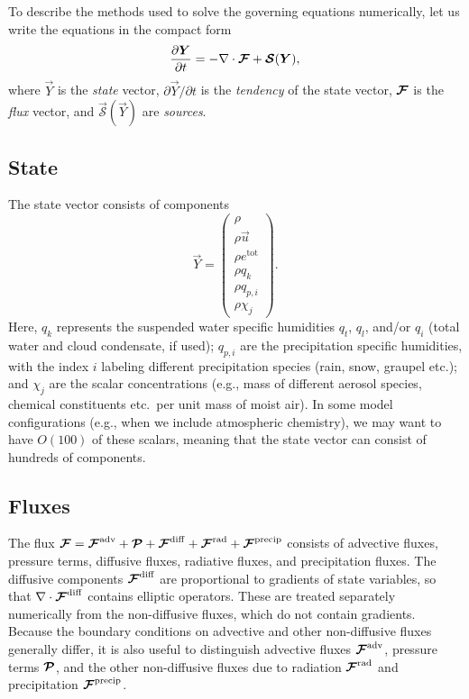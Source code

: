 \documentclass{report}
\begin{document}
{To describe the methods used to solve the governing equations numerically, let us write the equations in the compact form 
\begin{equation}\label{e:eom_compact}
\frac{\partial \boldsymbol{{Y}}}{\partial t}  =  - \nabla \cdot \boldsymbol{{\mathcal{F}}} + \boldsymbol{{\mathcal{S}}}(\boldsymbol{{Y}}),
\end{equation}
where $\vec{Y}$ is the \emph{state} vector, $\partial\vec{Y}/\partial t$ is the \emph{tendency} of the state vector, $\boldsymbol{{\mathcal{F}}}$ is the \emph{flux} vector, and $\vec{\mathcal{S}}(\vec{Y})$ are \emph{sources}. 

\subsection{State}

The state vector consists of components
\begin{equation}\label{e:state}
\vec{Y}=\left( \begin{array}{c}
\rho \\
\rho\vec{u} \\
\rho e^{\mathrm{tot}}\\
\rho q_k\\
\rho q_{p,i}\\
\rho \chi_j
\end{array}
\right).
\end{equation}
Here, $q_k$ represents the suspended water specific humidities $q_t$, $q_l$, and/or $q_i$ (total water and cloud condensate, if used); $q_{p,i}$ are the precipitation specific humidities, with the index $i$ labeling different precipitation species (rain, snow, graupel etc.); and $\chi_j$ are the scalar concentrations (e.g., mass of different aerosol species, chemical constituents etc.\ per unit mass of moist air). In some model configurations (e.g., when we include atmospheric chemistry), we may want to have $O(100)$ of these scalars, meaning that the state vector can consist of hundreds of components.

\subsection{Fluxes}\label{sec:fluxes}

The flux $\boldsymbol{{\mathcal{F}}}=\boldsymbol{{\mathcal{F}}}^{\mathrm{adv}} + \boldsymbol{{\mathcal{P}}} +  \boldsymbol{{\mathcal{F}}}^{\mathrm{diff}} + \boldsymbol{{\mathcal{F}}}^{\mathrm{rad}} + \boldsymbol{{\mathcal{F}}}^{\mathrm{precip}}$ consists of advective fluxes, pressure terms, diffusive fluxes, radiative fluxes, and precipitation fluxes. The diffusive components $\boldsymbol{{\mathcal{F}}}^{\mathrm{diff}}$ are proportional to gradients of state variables, so that $\nabla \cdot \boldsymbol{{\mathcal{F}}}^{\mathrm{diff}}$ contains elliptic operators. These are treated separately numerically from the non-diffusive fluxes, which do not contain gradients. Because the boundary conditions on advective and other non-diffusive fluxes generally differ, it is also useful to distinguish advective fluxes $\boldsymbol{{\mathcal{F}}}^{\mathrm{adv}}$, pressure terms $\boldsymbol{{\mathcal{P}}}$, and the other non-diffusive fluxes due to radiation $\boldsymbol{{\mathcal{F}}}^{\mathrm{rad}}$ and precipitation $\boldsymbol{{\mathcal{F}}}^{\mathrm{precip}}$. 

}
\end{document}
